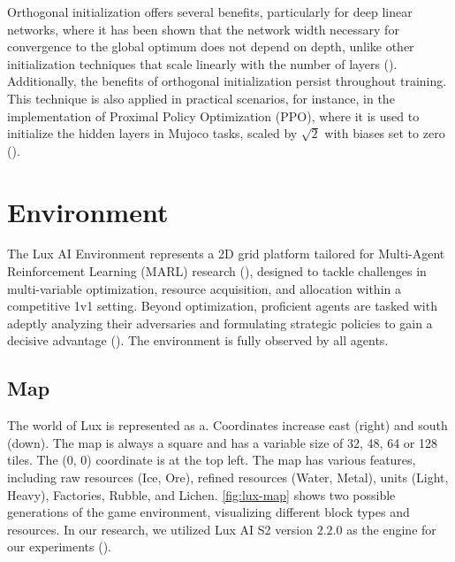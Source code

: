         \bigskip
        
        \noindent Orthogonal initialization offers several benefits, particularly for deep linear networks, where it has been shown that the network width necessary for convergence to the global optimum does not depend on depth, unlike other initialization techniques that scale linearly with the number of layers (\cite{hu2020provable}). Additionally, the benefits of orthogonal initialization persist throughout training. This technique is also applied in practical scenarios, for instance, in the implementation of Proximal Policy Optimization (PPO), where it is used to initialize the hidden layers in Mujoco tasks, scaled by $\sqrt{2}$ with biases set to zero (\cite{shengyi2022the37implementation}).

    \section{Environment} \label{sec:env}
    \label{sec:environment}

        \noindent The Lux AI Environment represents a 2D grid platform tailored for Multi-Agent Reinforcement Learning (MARL) research (\cite{chen2023emergent}), designed to tackle challenges in multi-variable optimization, resource acquisition, and allocation within a competitive 1v1 setting. Beyond optimization, proficient agents are tasked with adeptly analyzing their adversaries and formulating strategic policies to gain a decisive advantage (\textcolor{deepblue}{\cite{lux-ai-season-2}}). The environment is fully observed by all agents.
        
    \subsection{Map}

        \noindent The world of Lux is represented as a. Coordinates increase east (right) and south (down). The map is always a square and has a variable size of 32, 48, 64 or 128 tiles. The (0, 0) coordinate is at the top left. The map has various features, including raw resources (Ice, Ore), refined resources (Water, Metal), units (Light, Heavy), Factories, Rubble, and Lichen. \textcolor{deepblue}{\autoref{fig:lux-map}} shows two possible generations of the game environment, visualizing different block types and resources. In our research, we utilized Lux AI S2 version $2.2.0$ as the engine for our experiments (\textcolor{deepblue}{\cite{luxais2_neurips_23}}).
        
